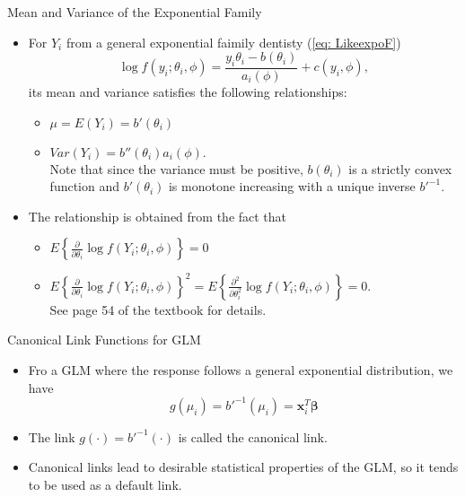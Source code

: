 \documentclass{beamer}
\begin{document}
     
        \begin{frame}{Mean and Variance of the Exponential Family}
        \begin{itemize}
            \item For $Y_{i}$ from a general exponential faimily dentisty (\ref{eq: LikeexpoF})
                $$\log f(y_{i};\theta_{i}, \phi) = \frac{y_{i}\theta_{i}-b(\theta_{i})}{a_{i}(\phi)} + c(y_{i}, \phi),$$
                its mean and variance satisfies the following relationships:
                \begin{itemize}
                    \item $\mu = E(Y_{i}) = b'(\theta_{i})$
                    \item $Var(Y_{i}) = b''(\theta_{i})a_{i}(\phi).$\\
                    Note that since the variance must be positive, $b(\theta_{i})$ is a strictly convex function and $b'(\theta_{i})$ is monotone increasing with a unique inverse $b'^{-1}$.
                \end{itemize}
            \item  The relationship is obtained from the fact that
            \begin{itemize}
                \item $E\left\{\frac{\partial}{\partial \theta_{i}}\log f(Y_{i}; \theta_{i}, \phi)\right\} = 0$
                \item $E\left\{\frac{\partial}{\partial \theta_{i}}\log f(Y_{i}; \theta_{i}, \phi)\right\}^2 = E\left\{\frac{\partial^2}{\partial \theta_{i}^2}\log f(Y_{i}; \theta_{i}, \phi)\right\} = 0.$\\
                See page 54 of the textbook for details.
            \end{itemize}
        \end{itemize}
        \end{frame}


     
        \begin{frame}{Canonical Link Functions for GLM}
        \begin{itemize}
            \item Fro a GLM where the response follows a general exponential distribution, we have
            $$g(\mu_{i}) = b'^{-1}(\mu_{i}) = \mathbf{x}^{T}_{i}\boldsymbol{\beta}$$
            \item The link $g(\cdot) = b'^{-1}(\cdot)$ is called the canonical link.
            \item Canonical links lead to desirable statistical properties of the GLM, so it tends to be used as a default link.  
            
        \end{itemize}
        \end{frame}
        
\end{document}
